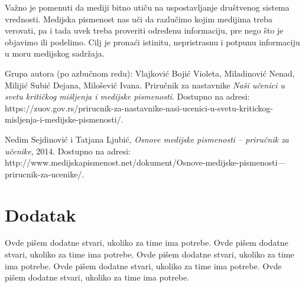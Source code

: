 \documentclass[a4paper]{article}
\begin{document}
Važno je pomenuti da mediji bitno utiču na uspostavljanje društvenog sistema vrednosti. Medijska pismenost nas uči da razlučimo kojim medijima treba verovati, pa i tada uvek treba proveriti određenu informaciju, pre nego što je objavimo ili podelimo. Cilj je pronaći istinitu, nepristrasnu i potpunu informaciju u moru medijskog sadržaja.



\appendix

\iffalse
 

\fi

\begin{thebibliography}{9}


 Grupa autora (po azbučnom redu): Vlajković Bojić Violeta, Miladinović Nenad, Milijić Subić Dejana, Milošević Ivana. Priručnik za nastavnike \emph{ Naši učenici u svetu kritičkog mišljenja i medijske pismenosti}. Dostupno na adresi: https://zuov.gov.rs/prirucnik-za-nastavnike-nasi-ucenici-u-svetu-kritickog-misljenja-i-medijske-pismenosti/.

 Nedim Sejdinović i Tatjana Ljubić, \emph{Osnove medijske pismenosti – priručnik za učenike}, 2014. Dostupno na adresi:
http://www.medijskapismenost.net/dokument/Osnove-medijske-pismenosti---prirucnik-za-ucenike/.



\end{thebibliography}


\appendix
\section{Dodatak}
Ovde pišem dodatne stvari, ukoliko za time ima potrebe.
Ovde pišem dodatne stvari, ukoliko za time ima potrebe.
Ovde pišem dodatne stvari, ukoliko za time ima potrebe.
Ovde pišem dodatne stvari, ukoliko za time ima potrebe.
Ovde pišem dodatne stvari, ukoliko za time ima potrebe.
\end{document}
